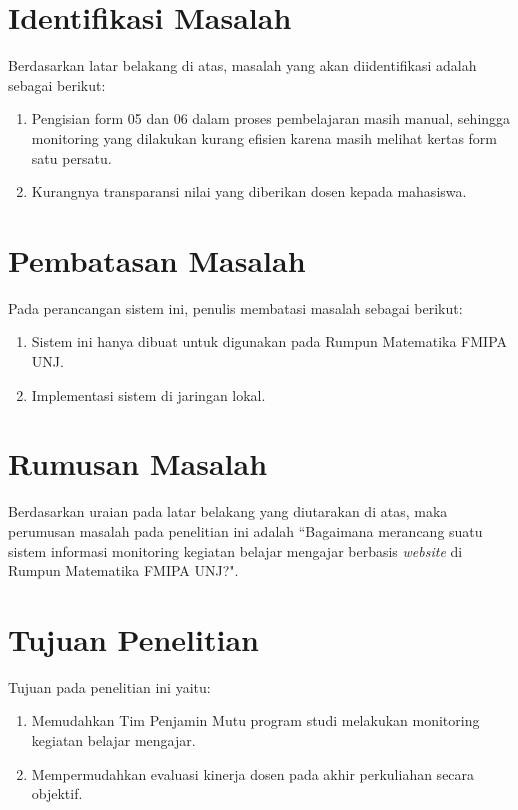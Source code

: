 	
\section{Identifikasi Masalah}
Berdasarkan latar belakang di atas, masalah yang akan diidentifikasi adalah sebagai berikut: 
\begin{enumerate}
	\item Pengisian form 05 dan 06 dalam proses pembelajaran masih manual, sehingga monitoring yang dilakukan kurang efisien karena masih melihat kertas form satu persatu.
	\item Kurangnya transparansi nilai yang diberikan dosen kepada mahasiswa.
\end{enumerate}

\section{Pembatasan Masalah}
Pada perancangan sistem ini, penulis membatasi masalah sebagai berikut:
\begin{enumerate}
	\item Sistem ini hanya dibuat untuk digunakan pada Rumpun Matematika FMIPA UNJ.
	\item Implementasi sistem di jaringan lokal.	
\end{enumerate}

\section{Rumusan Masalah}
Berdasarkan uraian pada latar belakang yang diutarakan di atas, maka perumusan masalah pada penelitian ini adalah “Bagaimana merancang suatu sistem informasi monitoring kegiatan belajar mengajar berbasis \textit{website} di Rumpun Matematika FMIPA UNJ?".


\section{Tujuan Penelitian}
Tujuan pada penelitian ini yaitu:
\begin{enumerate}
	\item Memudahkan Tim Penjamin Mutu program studi melakukan monitoring kegiatan belajar mengajar.
	\item Mempermudahkan evaluasi kinerja dosen pada akhir perkuliahan secara objektif.
\end{enumerate}

